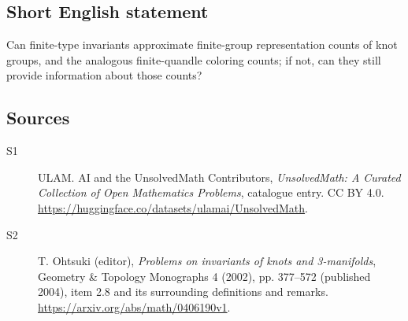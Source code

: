 \documentclass[11pt]{article}
\begin{document}
\subsection{Short English statement}
Can finite-type invariants approximate finite-group representation counts of knot groups, and the analogous finite-quandle coloring counts; if not, can they still provide information about those counts?
\subsection{Sources}
\begin{description}
\item[\hypertarget{source:statement:1}{S1}] ULAM. AI and the UnsolvedMath Contributors, \emph{UnsolvedMath: A Curated Collection of Open Mathematics Problems}, catalogue entry. CC BY 4.0. \url{https://huggingface.co/datasets/ulamai/UnsolvedMath}.
\item[\hypertarget{source:statement:2}{S2}] T. Ohtsuki (editor), \emph{Problems on invariants of knots and 3-manifolds}, Geometry \& Topology Monographs 4 (2002), pp. 377--572 (published 2004), item 2.8 and its surrounding definitions and remarks. \url{https://arxiv.org/abs/math/0406190v1}.
\end{description}
\label{end:statement}
\end{document}
